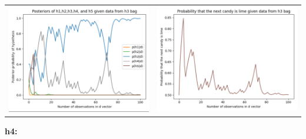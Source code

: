 \documentclass[]{article}
\begin{document}
\begin{center}
    \begin{tabular}{cc}
    \includegraphics[scale = 0.30]{2_a_posteriors_h3.png} & \includegraphics[scale = 0.30]{2_a_lime_h3.png} 
\end{tabular}
\end{center}
\textbf{h4:}
\end{document}
